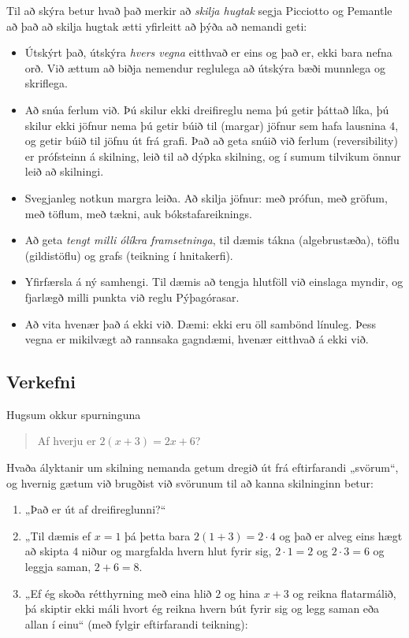 \documentclass[
  icelandic,
]{book}
\providecommand{\tightlist}{%
  \setlength{\itemsep}{0pt}\setlength{\parskip}{0pt}}
\begin{document}
Til að skýra betur hvað það merkir að \emph{skilja hugtak} segja Picciotto og Pemantle að það að skilja hugtak ætti yfirleitt að þýða að nemandi geti:

\begin{itemize}
\tightlist
\item
  Útskýrt það, útskýra \emph{hvers vegna} eitthvað er eins og það er, ekki bara nefna orð. Við ættum að biðja nemendur reglulega að útskýra bæði munnlega og skriflega.
\item
  Að snúa ferlum við. Þú skilur ekki dreifireglu nema þú getir þáttað líka, þú skilur ekki jöfnur nema þú getir búið til (margar) jöfnur sem hafa lausnina \(4\), og getir búið til jöfnu út frá grafi. Það að geta snúið við ferlum (reversibility) er prófsteinn á skilning, leið til að dýpka skilning, og í sumum tilvikum önnur leið að skilningi.
\item
  Svegjanleg notkun margra leiða. Að skilja jöfnur: með prófun, með gröfum, með töflum, með tækni, auk bókstafareiknings.
\item
  Að geta \emph{tengt milli ólíkra framsetninga}, til dæmis tákna (algebrustæða), töflu (gildistöflu) og grafs (teikning í hnitakerfi).
\item
  Yfirfærsla á ný samhengi. Til dæmis að tengja hlutföll við einslaga myndir, og fjarlægð milli punkta við reglu Pýþagórasar.
\item
  Að vita hvenær það á ekki við. Dæmi: ekki eru öll sambönd línuleg. Þess vegna er mikilvægt að rannsaka gagndæmi, hvenær eitthvað á ekki við.
\end{itemize}

\subsection{Verkefni}\label{verkefni}

Hugsum okkur spurninguna

\begin{quote}
Af hverju er \(2(x+3) = 2x + 6\)?
\end{quote}

Hvaða ályktanir um skilning nemanda getum dregið út frá eftirfarandi „svörum``, og hvernig gætum við brugðist við svörunum til að kanna skilninginn betur:

\begin{enumerate}
\def\labelenumi{\arabic{enumi}.}
\tightlist
\item
  „Það er út af dreifireglunni?{}``
\item
  „Til dæmis ef \(x=1\) þá þetta bara \(2(1+3)=2 \cdot 4\) og það er alveg eins hægt að skipta \(4\) niður og margfalda hvern hlut fyrir sig, \(2 \cdot 1 = 2\) og \(2 \cdot 3 = 6\) og leggja saman, \(2+6=8\).
\item
  „Ef ég skoða rétthyrning með eina hlið \(2\) og hina \(x+3\) og reikna flatarmálið, þá skiptir ekki máli hvort ég reikna hvern bút fyrir sig og legg saman eða allan í einu`` (með fylgir eftirfarandi teikning):
\end{enumerate}
\end{document}
